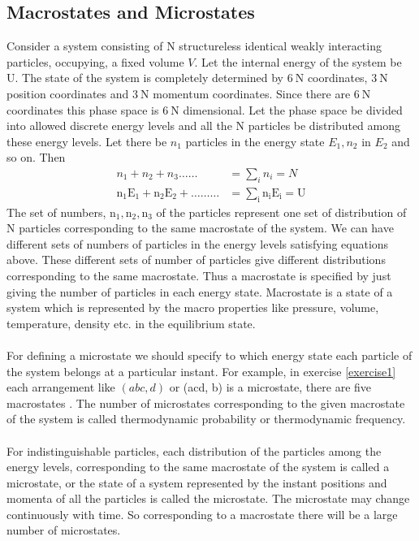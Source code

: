 \subsection{Macrostates and Microstates}
\par Consider a system consisting of $\mathrm{N}$ structureless identical weakly interacting particles, occupying, a fixed volume $V$. Let the internal energy of the system be U. The state of the system is completely determined by $6 \mathrm{~N}$ coordinates, $3 \mathrm{~N}$ position coordinates and $3 \mathrm{~N}$ momentum coordinates. Since there are $6 \mathrm{~N}$ coordinates this phase space is $6 \mathrm{~N}$ dimensional. Let the phase space be divided into allowed discrete energy levels and all the $\mathrm{N}$ particles be distributed among these energy levels. Let there be $n_{1}$ particles in the energy state $E_{1}, n_{2}$ in $E_{2}$ and so on. Then
\begin{align*}
n_{1}+n_{2}+n_{3} \ldots \ldots&=\sum_{i} n_{i}=N\\
\mathrm{n}_{1} \mathrm{E}_{1}+\mathrm{n}_{2} \mathrm{E}_{2}+\ldots \ldots \ldots&=\sum_{\mathrm{i}} \mathrm{n}_{\mathrm{i}} \mathrm{E}_{\mathrm{i}}=\mathrm{U}
\end{align*}
 The set of numbers, $\mathrm{n}_{1}, \mathrm{n}_{2}, \mathrm{n}_{3}$ of the particles represent one set of distribution of $\mathrm{N}$ particles corresponding to the same macrostate of the system. We can have different sets of numbers of particles in the energy levels satisfying equations above. These different sets of number of particles give different distributions corresponding to the same macrostate. Thus a macrostate is specified by just giving the number of particles in each energy state. Macrostate is a state of a system which is represented by the macro properties like pressure, volume, temperature, density etc. in the equilibrium state.\\\\
For defining a microstate we should specify to which energy state each particle of the system belongs at a particular instant. For example, in exercise \ref{exercise1} each arrangement like $(a b c, d)$ or (acd, b) is a microstate, there are five macrostates . The number of microstates corresponding to the given macrostate of the system is called thermodynamic probability or thermodynamic frequency.\\\\
For indistinguishable particles, each distribution of the particles among the energy levels, corresponding to the same macrostate of the system is called a microstate, or the state of a system represented by the instant positions and momenta of all the particles is called the microstate. The microstate may change continuously with time. So corresponding to a macrostate there will be a large number of microstates.
